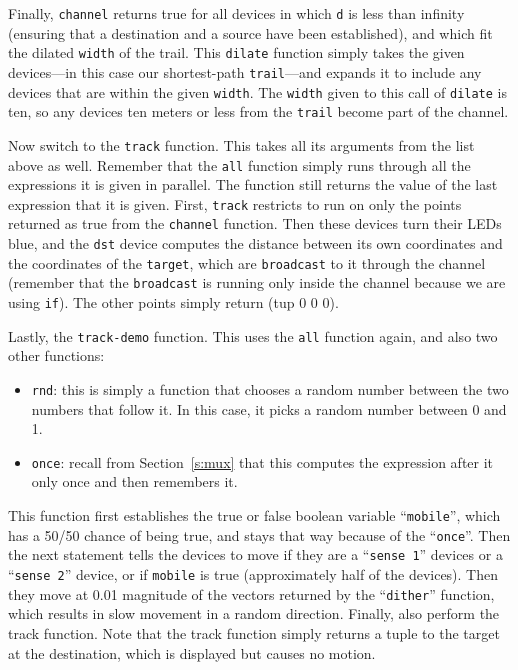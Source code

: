 \documentclass{article}
\newcommand\var[1]{{\tt #1}}
\newcommand\qvar[1]{``{\tt #1}''}
\begin{document}
Finally, \var{channel} returns true for all devices in which \var{d}
is less than infinity (ensuring that a destination and a source have
been established), and which fit the dilated \var{width} of the
trail. This \var{dilate} function simply takes the given devices---in
this case our shortest-path \var{trail}---and expands it to include
any devices that are within the given \var{width}. The \var{width}
given to this call of \var{dilate} is ten, so any devices ten meters
or less from the \var{trail} become part of the channel.

Now switch to the \var{track} function.  This takes all its arguments
from the list above as well.  Remember that the \var{all} function
simply runs through all the expressions it is given in parallel.  The
function still returns the value of the last expression that it is
given.  First, \var{track} restricts to run on only the points
returned as true from the \var{channel} function.  Then these devices
turn their LEDs blue, and the \var{dst} device computes the distance
between its own coordinates and the coordinates of the \var{target},
which are \var{broadcast} to it through the channel (remember that the
\var{broadcast} is running only inside the channel because we are
using \var{if}).  The other points simply return (tup 0 0 0).

Lastly, the \var{track-demo} function.  This uses the \var{all}
function again, and also two other functions:
\begin{itemize}
\item \var{rnd}: this is simply a function that chooses a random
  number between the two numbers that follow it.  In this case, it
  picks a random number between 0 and 1.
\item \var{once}: recall from Section~\ref{s:mux} that this computes
  the expression after it only once and then remembers it.
\end{itemize}

This function first establishes the true or false boolean variable
\qvar{mobile}, which has a 50/50 chance of being true, and stays that
way because of the \qvar{once}.  Then the next statement tells the
devices to move if they are a \qvar{sense 1} devices or a \qvar{sense
  2} device, or if \var{mobile} is true (approximately half of the
devices).  Then they move at 0.01 magnitude of the vectors returned by
the \qvar{dither} function, which results in slow movement in a random
direction.  Finally, also perform the track function.  Note that the
track function simply returns a tuple to the target at the
destination, which is displayed but causes no motion.
\end{document}
